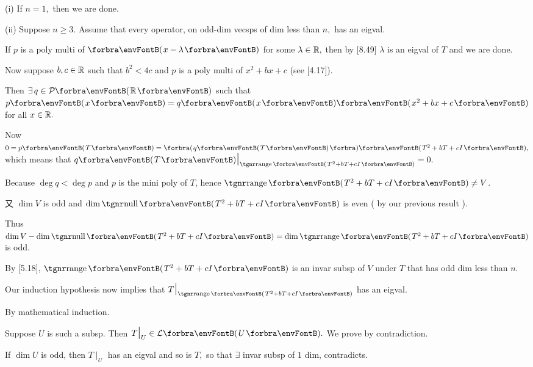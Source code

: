 \documentclass[a4paper, 11pt, UTF8]{article}
\begin{document}
\begin{large}
\par\quad
(i) If $n=1,$ then we are done.\par\quad\Endi
(ii) Suppose $n\geqslant 3.$ Assume that every operator, on odd-dim vecsps of dim less than $n,$ has an eigval.\par\quad\Hii
If $p$ is a poly multi of $\Par{x - \lambda}$ for some $\lambda\in{\mathbb{R}},$ then by [8.49] $\lambda$ is an eigval of $T$ and we are done.\par\quad\Hii
Now suppose $b, c\in{\mathbb{R}}$ such that $b^2 < 4c$ and $p$ is a poly multi of $x^2 + bx + c$ (see [4.17]).\par\quad\Hii
Then $\exists\,q\in\PoR{}$ such that $p\Par{x} = q\Par{x}\Par{x^2 + bx + c}$ for all $x\in{\mathbb{R}}.$\par\quad\Hii
Now $0 = p\Par{T} = \BigPar{q\Par{T}}\Par{T^2 + bT + cI},$ which means that $q\Par{T}\mid_{\range\Par{T^2+bT+cI}}=0.$\par\quad\Hii
Because $\deg q < \deg p$ and $p$ is the mini poly of $T$, hence $\range\Par{T^2 + bT + cI}\neq V$.\par\quad\Hii
又 $\dim V$ is odd and $\dim\null\Par{T^2 +bT+cI}$ is even ( by our previous result ).\par\quad\Hii
Thus $\dim V - \dim \null\Par{T^2 + bT + cI}=\dim \range\Par{T^2 + bT + cI}$ is odd.\par\quad\Hii
By [5.18], $\range\Par{T^2 + bT + cI}$ is an invar subsp of $V$ under $T$ that has odd dim less than $n.$\par\quad\Hii
Our induction hypothesis now implies that $T\mid_{\range\Par{T^2 + bT + cI}}$ has an eigval.\par\quad
By mathematical induction.\PfEnd
\SepLine

\par\quad
Suppose $U$ is such a subsp. Then $T\mid_U\in\Lm{U}.$
We prove by contradiction.\par\quad
If $\dim U$ is odd, then $T\mid_U$ has an eigval and so is $T,$ so that $\exists$ invar subsp of $1$ dim, contradicts.\PfEnd
\SepLine


\end{large}
\end{document}
